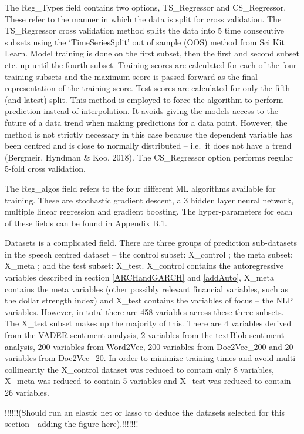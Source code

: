 \documentclass[11pt,preprint, authoryear]{elsarticle}
\numberwithin{equation}{section}
\numberwithin{figure}{section}
\numberwithin{table}{section}
\begin{document}
The Reg\_Types field contains two options, TS\_Regressor and
CS\_Regressor. These refer to the manner in which the data is split for
cross validation. The TS\_Regressor cross validation method splits the
data into 5 time consecutive subsets using the `TimeSeriesSplit' out of
sample (OOS) method from Sci Kit Learn. Model training is done on the
first subset, then the first and second subset etc. up until the fourth
subset. Training scores are calculated for each of the four training
subsets and the maximum score is passed forward as the final
representation of the training score. Test scores are calculated for
only the fifth (and latest) split. This method is employed to force the
algorithm to perform prediction instead of interpolation. It avoids
giving the models access to the future of a data trend when making
predictions for a data point. However, the method is not strictly
necessary in this case because the dependent variable has been centred
and is close to normally distributed -- i.e.~it does not have a trend
(Bergmeir, Hyndman \& Koo, 2018). The CS\_Regressor option performs
regular 5-fold cross validation.

The Reg\_algos field refers to the four different ML algorithms
available for training. These are stochastic gradient descent, a 3
hidden layer neural network, multiple linear regression and gradient
boosting. The hyper-parameters for each of these fields can be found in
Appendix B.1.

Datasets is a complicated field. There are three groups of prediction
sub-datasets in the speech centred dataset -- the control subset:
X\_control ; the meta subset: X\_meta ; and the test subset: X\_test.
X\_control contains the autoregressive variables described in section
\ref{ARCHandGARCH} and \ref{addAuto}, X\_meta contains the meta
variables (other possibly relevant financial variables, such as the
dollar strength index) and X\_test contains the variables of focus --
the NLP variables. However, in total there are 458 variables across
these three subsets. The X\_test subset makes up the majority of this.
There are 4 variables derived from the VADER sentiment analysis, 2
variables from the textBlob sentiment analysis, 200 variables from
Word2Vec, 200 variables from Doc2Vec\_200 and 20 variables from
Doc2Vec\_20. In order to minimize training times and avoid
multi-collinearity the X\_control dataset was reduced to contain only 8
variables, X\_meta was reduced to contain 5 variables and X\_test was
reduced to contain 26 variables.

!!!!!!(Should run an elastic net or lasso to deduce the datasets
selected for this section - adding the figure here).!!!!!!!
\end{document}

